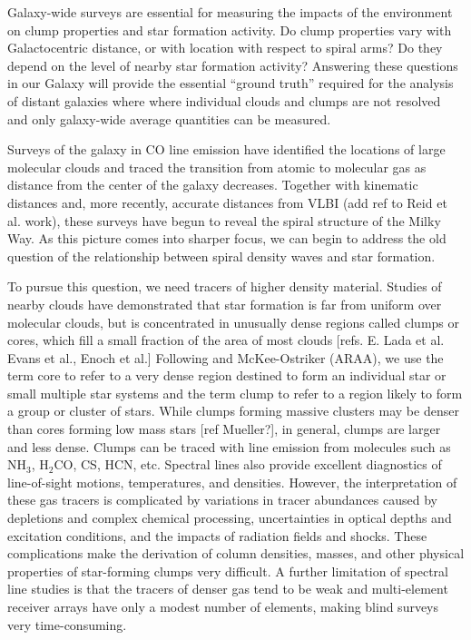 \documentclass[12pt,preprint]{aastex}
\newcommand{\ammonia}{\mbox{{\rm NH}$_3$}}
\newcommand{\form}{H$_2$CO}
\begin{document}
Galaxy-wide surveys are essential for measuring the impacts of the
environment on clump properties and star formation activity.
Do clump properties vary with Galactocentric distance, or
with location with respect to spiral arms?  Do they depend on the
level of nearby star formation activity?
Answering these questions in our Galaxy will provide the
essential ``ground truth'' required for the analysis of distant
galaxies where where individual clouds and clumps are not resolved and
only galaxy-wide average quantities can be measured.

Surveys of the galaxy in CO line emission \citep{dame01,FCRAO} have
identified the locations of large molecular clouds and traced
the transition from atomic to molecular gas as distance from the
center of the galaxy decreases. Together with kinematic distances
\citep[e.g.][]{RotationCurve} and, more recently, accurate distances
from VLBI (add ref to Reid et al. work), these surveys have begun to
reveal the spiral structure of the Milky Way. As this picture comes into
sharper focus, we can begin to address the old question of the relationship
between spiral density waves and star formation.

To pursue this question, we need tracers of higher density material.
Studies of nearby clouds have demonstrated that star formation is far
from uniform over molecular clouds, but is concentrated in unusually dense
regions called clumps or cores, which fill a small fraction of the area
of most clouds [refs. E. Lada et al. Evans et al., Enoch et al.]
Following \citet{williams00} and McKee-Ostriker (ARAA), we
use the term core to refer to a very dense region destined to form an
individual star or small multiple star systems and the term clump to
refer to a
region likely to form a group or cluster of stars. While clumps forming
massive clusters may be denser than cores forming low mass stars
[ref Mueller?],
in general, clumps are larger and less dense. Clumps can be traced
with line emission from molecules such as \ammonia, \form, CS, HCN, etc.
Spectral lines also provide excellent diagnostics of
line-of-sight motions, temperatures, and densities.
However, the interpretation of these gas tracers is complicated by
variations in tracer abundances caused by depletions and complex
chemical processing, uncertainties in optical depths and excitation
conditions, and the impacts of radiation fields and shocks. These
complications make the derivation of column densities, masses, and
other physical properties of star-forming clumps very difficult.
A further limitation of spectral line studies is that the tracers of
denser gas tend to be weak and multi-element receiver arrays have
only a modest number of elements, making blind surveys very time-consuming.
\end{document}
